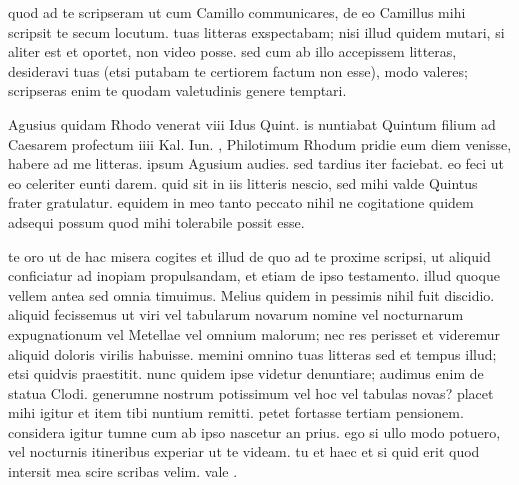 


 quod ad te scripseram ut cum Camillo communicares, de eo Camillus mihi scripsit te secum locutum. tuas litteras exspectabam; nisi illud quidem mutari, si aliter est et oportet, non video posse. sed cum ab illo accepissem litteras, desideravi tuas (etsi putabam te certiorem factum non esse), modo valeres; scripseras enim te quodam valetudinis genere temptari.

 Agusius quidam Rhodo venerat viii Idus Quint. is nuntiabat Quintum filium ad Caesarem profectum iiii Kal. Iun. , Philotimum Rhodum pridie eum diem venisse, habere ad me litteras. ipsum Agusium audies. sed tardius iter faciebat. eo feci ut eo celeriter eunti darem. quid sit in iis litteris nescio, sed mihi valde Quintus frater gratulatur. equidem in meo tanto peccato nihil ne cogitatione quidem adsequi possum quod mihi tolerabile possit esse.

 te oro ut de hac misera cogites et illud de quo ad te proxime scripsi, ut aliquid conficiatur ad inopiam propulsandam, et etiam de ipso testamento. illud quoque vellem antea sed omnia timuimus. Melius quidem in pessimis nihil fuit discidio. aliquid fecissemus ut viri vel tabularum novarum nomine vel nocturnarum expugnationum vel Metellae vel omnium malorum; nec res perisset et videremur aliquid doloris virilis habuisse. memini omnino tuas litteras sed et tempus illud; etsi quidvis praestitit. nunc quidem ipse videtur denuntiare; audimus enim de statua Clodi. generumne nostrum potissimum vel hoc vel tabulas novas? placet mihi igitur et item tibi nuntium remitti. petet fortasse tertiam pensionem. considera igitur tumne cum ab ipso nascetur an prius. ego si ullo modo potuero, vel nocturnis itineribus experiar ut te videam. tu et haec et si quid erit quod intersit mea scire scribas velim. vale .
